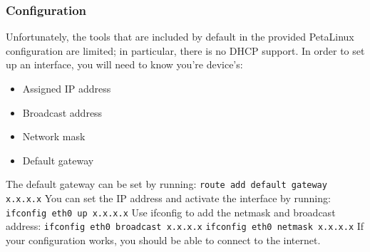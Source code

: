 \documentclass[12pt]{report}
\begin{document}
\subsubsection{Configuration}
Unfortunately, the tools that are included by default in the provided PetaLinux configuration are limited; in particular, there is no DHCP support. In order to set up an interface, you will need to know you're device's:
\begin{itemize}
\item Assigned IP address
\item Broadcast address
\item Network mask
\item Default gateway
\end{itemize}
The default gateway can be set by running:
\newline \texttt{route add default gateway x.x.x.x}
\newline You can set the IP address and activate the interface by running:
\newline \texttt{ifconfig eth0 up x.x.x.x}
\newline Use ifconfig to add the netmask and broadcast address:
\newline \texttt{ifconfig eth0 broadcast x.x.x.x}
\newline \texttt{ifconfig eth0 netmask x.x.x.x}
\newline If your configuration works, you should be able to connect to the internet.
\end{document}
